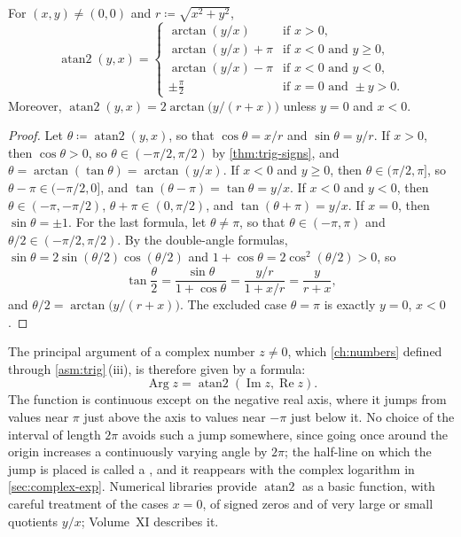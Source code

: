 \begin{proposition}
\label{prop:atan2}
For $(x,y)\ne(0,0)$ and $r\coloneqq\sqrt{x^2+y^2}$,
\[
\operatorname{atan2}(y,x)=\begin{cases}
\arctan(y/x)&\text{if }x>0,\\
\arctan(y/x)+\pi&\text{if }x<0\text{ and }y\ge0,\\
\arctan(y/x)-\pi&\text{if }x<0\text{ and }y<0,\\
\pm\frac\pi2&\text{if }x=0\text{ and }\pm y>0 .
\end{cases}
\]
Moreover, $\operatorname{atan2}(y,x)=2\arctan\bigl(y/(r+x)\bigr)$ unless $y=0$ and $x<0$.
\end{proposition}

\begin{proof}
Let $\theta\coloneqq\operatorname{atan2}(y,x)$, so that $\cos\theta=x/r$ and $\sin\theta=y/r$. If $x>0$, then $\cos\theta>0$, so $\theta\in(-\pi/2,\pi/2)$ by \cref{thm:trig-signs}, and $\theta=\arctan(\tan\theta)=\arctan(y/x)$. If $x<0$ and $y\ge0$, then $\theta\in(\pi/2,\pi]$, so $\theta-\pi\in(-\pi/2,0]$, and $\tan(\theta-\pi)=\tan\theta=y/x$. If $x<0$ and $y<0$, then $\theta\in(-\pi,-\pi/2)$, $\theta+\pi\in(0,\pi/2)$, and $\tan(\theta+\pi)=y/x$. If $x=0$, then $\sin\theta=\pm1$. For the last formula, let $\theta\ne\pi$, so that $\theta\in(-\pi,\pi)$ and $\theta/2\in(-\pi/2,\pi/2)$. By the double-angle formulas, $\sin\theta=2\sin(\theta/2)\cos(\theta/2)$ and $1+\cos\theta=2\cos^2(\theta/2)>0$, so
\[
\tan\frac\theta2=\frac{\sin\theta}{1+\cos\theta}=\frac{y/r}{1+x/r}=\frac y{r+x},
\]
and $\theta/2=\arctan\bigl(y/(r+x)\bigr)$. The excluded case $\theta=\pi$ is exactly $y=0$, $x<0$.
\end{proof}

The principal argument of a complex number $z\ne0$, which \cref{ch:numbers} defined through \cref{asm:trig}\,(iii), is therefore given by a formula:
\[
\operatorname{Arg}z=\operatorname{atan2}(\operatorname{Im}z,\operatorname{Re}z).
\]
The function is continuous except on the negative real axis, where it jumps from values near $\pi$ just above the axis to values near $-\pi$ just below it. No choice of the interval of length $2\pi$ avoids such a jump somewhere, since going once around the origin increases a continuously varying angle by $2\pi$; the half-line on which the jump is placed is called a , and it reappears with the complex logarithm in \cref{sec:complex-exp}. Numerical libraries provide $\operatorname{atan2}$ as a basic function, with careful treatment of the cases $x=0$, of signed zeros and of very large or small quotients $y/x$; Volume~XI describes it.

